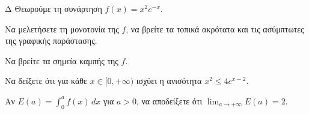 \begin{thema}{Δ}
Θεωρούμε τη συνάρτηση $f(x) = x^2e^{-x}$.
\begin{erwthma}
    \item Να μελετήσετε τη μονοτονία της $f$, να βρείτε τα τοπικά ακρότατα και τις ασύμπτωτες της γραφικής παράστασης.
    \item Να βρείτε τα σημεία καμπής της $f$.
    \item Να δείξετε ότι για κάθε $x \in [0,+\infty)$ ισχύει η ανισότητα $x^2 \leq 4e^{x-2}$.
    \item Αν $E(a) = \displaystyle\int_0^a f(x)\,dx$ για $a > 0$, να αποδείξετε ότι $\displaystyle\lim_{a \to +\infty} E(a) = 2$.
\end{erwthma}
\end{thema}
